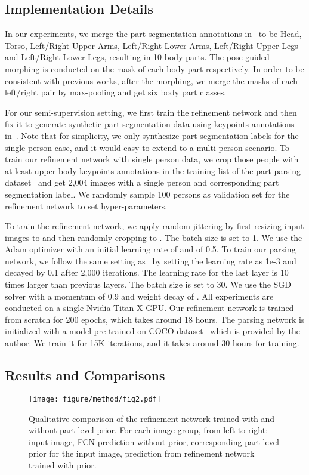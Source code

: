 \documentclass[10pt,twocolumn,letterpaper]{article}
\begin{document}
\subsection{Implementation Details}
\label{sec:implem}
In our experiments, we merge the part segmentation annotations in~\cite{chen2014detect} to be Head, Torso, Left/Right Upper Arms, Left/Right Lower Arms, Left/Right Upper Legs and Left/Right Lower Legs, resulting in 10 body parts. The pose-guided morphing is conducted on the mask of each body part respectively. In order to be consistent with previous works, after the morphing, we merge the masks of each left/right pair by max-pooling and get six body part classes.

For our semi-supervision setting, we first train the refinement network and then fix it to generate synthetic part segmentation data using keypoints annotations in~\cite{andriluka14cvpr}. Note that for simplicity, we only synthesize part segmentation labels for the single person case, and it would easy to extend to a multi-person scenario. To train our refinement network with single person data, we crop those people with at least upper body keypoints annotations in the training list of the part parsing dataset~\cite{chen2014detect} and get 2,004 images with a single person and corresponding part segmentation label. We randomly sample 100 persons as validation set for the refinement network to set hyper-parameters.

To train the refinement network, we apply random jittering by first resizing input images to  and then randomly cropping to . The batch size is set to 1. We use the Adam optimizer with an initial learning rate of  and  of 0.5. To train our parsing network, we follow the same setting as~\cite{chen2016attention} by setting the learning rate as 1e-3 and decayed by 0.1 after 2,000 iterations. The learning rate for the last layer is 10 times larger than previous layers. The batch size is set to 30. We use the SGD solver with a momentum of 0.9 and weight decay of . All experiments are conducted on a single Nvidia Titan X GPU. Our refinement network is trained from scratch for 200 epochs, which takes around 18 hours. The parsing network is initialized with a model pre-trained on COCO dataset~\cite{lin2014microsoft} which is provided by the author. We train it for 15K iterations, and it takes around 30 hours for training.

\subsection{Results and Comparisons}
\begin{figure}[t!]
\begin{center}
\texttt{[image: figure/method/fig2.pdf]}
\end{center}
\vspace{-3mm}
   \caption{Qualitative comparison of the refinement network trained with and without part-level prior. For each image group, from left to right: input image, FCN prediction without prior, corresponding part-level prior for the input image, prediction from refinement network trained with prior.}
\label{fig:prior}
\vspace{-2mm}
\end{figure}
\end{document}
